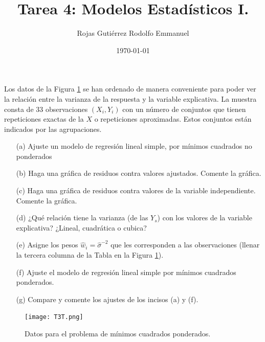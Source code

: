 \documentclass[10.5pt,notitlepage]{article}
\title{Tarea 4: Modelos Estadísticos I.}
\author{Rojas Gutiérrez Rodolfo Emmanuel}
\date{\today}
\theoremstyle{plain}
\begin{document}
\maketitle

\setcounter{exo}{0}
\begin{exo}
Los datos de la Figura \ref{fig:1} se han ordenado de manera conveniente para poder ver la relación 
entre la varianza de la respuesta y la variable explicativa. La muestra consta de 33 observaciones $(X_i,Y_i)$
con un número de conjuntos que tienen repeticiones exactas de la $X$ o repeticiones aproximadas. Estos 
conjuntos están indicados por las agrupaciones.
    \begin{itemize}
        \item[(a)] Ajuste un modelo de regresión lineal simple, por mínimos cuadrados no ponderados 
        \item[(b)] Haga una gráfica de residuos contra valores ajustados. Comente la gráfica. 
        \item[(c)] Haga una gráfica de residuos contra valores de la variable independiente. Comente la gráfica. 
        \item[(d)] ¿Qué relación tiene la varianza (de las 
         $Y_s$) con los valores de la variable explicativa? ¿Lineal, 
          cuadrática o cubica? 
        \item[(e)] Asigne los pesos $\hat{w}_i=\hat{\sigma}^{-2}$ que les corresponden a las observaciones (llenar la tercera columna de la 
         Tabla en la Figura \ref{fig:1}). 
        \item[(f)] Ajuste el modelo de regresión lineal simple por mínimos cuadrados ponderados. 
        \item[(g)] Compare y comente los ajustes de los incisos (a) y (f).
    \end{itemize}
\end{exo}
\begin{figure}[htb]
 \centering
 \texttt{[image: T3T.png]}
 \caption{Datos para el problema de mínimos cuadrados ponderados.}
 \label{fig:1}
\end{figure}
\end{document}
